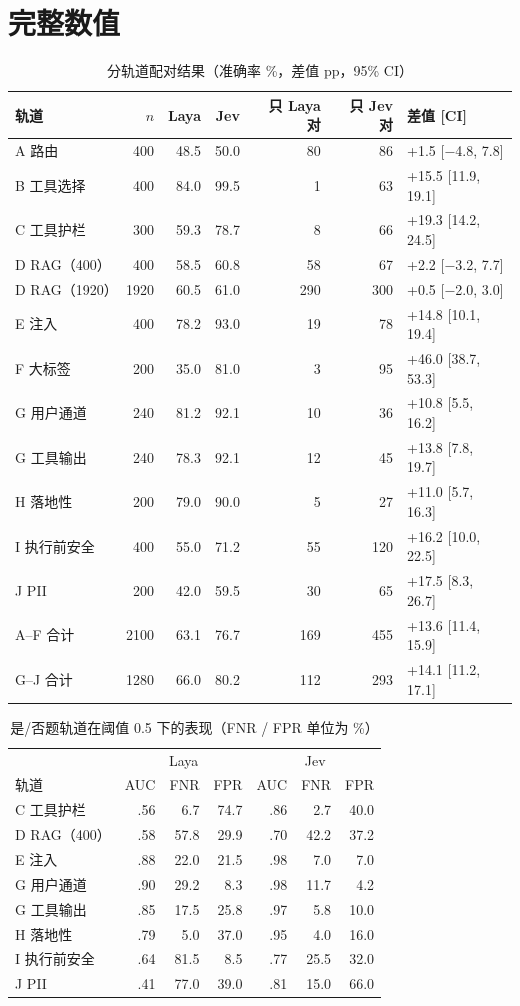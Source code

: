 \documentclass[UTF8,fontset=none,zihao=-4]{ctexart}
\newcommand{\laya}{\textsf{Laya}}
\newcommand{\jev}{\textsf{Jev}}
\begin{document}
\section{完整数值}
\begin{longtable}{@{}lrrrrrl@{}}
\caption{分轨道配对结果（准确率 \%，差值 pp，95\% CI）}\\
\toprule
轨道 & $n$ & \laya{} & \jev{} & 只 \laya{} 对 & 只 \jev{} 对 & 差值 [CI]\\
\midrule
\endhead
A 路由 & 400 & 48.5 & 50.0 & 80 & 86 & +1.5 [$-$4.8, 7.8]\\
B 工具选择 & 400 & 84.0 & 99.5 & 1 & 63 & +15.5 [11.9, 19.1]\\
C 工具护栏 & 300 & 59.3 & 78.7 & 8 & 66 & +19.3 [14.2, 24.5]\\
D RAG（400） & 400 & 58.5 & 60.8 & 58 & 67 & +2.2 [$-$3.2, 7.7]\\
D RAG（1920） & 1920 & 60.5 & 61.0 & 290 & 300 & +0.5 [$-$2.0, 3.0]\\
E 注入 & 400 & 78.2 & 93.0 & 19 & 78 & +14.8 [10.1, 19.4]\\
F 大标签 & 200 & 35.0 & 81.0 & 3 & 95 & +46.0 [38.7, 53.3]\\
G 用户通道 & 240 & 81.2 & 92.1 & 10 & 36 & +10.8 [5.5, 16.2]\\
G 工具输出 & 240 & 78.3 & 92.1 & 12 & 45 & +13.8 [7.8, 19.7]\\
H 落地性 & 200 & 79.0 & 90.0 & 5 & 27 & +11.0 [5.7, 16.3]\\
I 执行前安全 & 400 & 55.0 & 71.2 & 55 & 120 & +16.2 [10.0, 22.5]\\
J PII & 200 & 42.0 & 59.5 & 30 & 65 & +17.5 [8.3, 26.7]\\
\midrule
A--F 合计 & 2100 & 63.1 & 76.7 & 169 & 455 & +13.6 [11.4, 15.9]\\
G--J 合计 & 1280 & 66.0 & 80.2 & 112 & 293 & +14.1 [11.2, 17.1]\\
\bottomrule
\end{longtable}

\begin{longtable}{@{}lrrrrrr@{}}
\caption{是/否题轨道在阈值 0.5 下的表现（FNR / FPR 单位为 \%）}\\
\toprule
& \multicolumn{3}{c}{\laya} & \multicolumn{3}{c}{\jev}\\
轨道 & AUC & FNR & FPR & AUC & FNR & FPR\\
\midrule
\endhead
C 工具护栏 & .56 & 6.7 & 74.7 & .86 & 2.7 & 40.0\\
D RAG（400） & .58 & 57.8 & 29.9 & .70 & 42.2 & 37.2\\
E 注入 & .88 & 22.0 & 21.5 & .98 & 7.0 & 7.0\\
G 用户通道 & .90 & 29.2 & 8.3 & .98 & 11.7 & 4.2\\
G 工具输出 & .85 & 17.5 & 25.8 & .97 & 5.8 & 10.0\\
H 落地性 & .79 & 5.0 & 37.0 & .95 & 4.0 & 16.0\\
I 执行前安全 & .64 & 81.5 & 8.5 & .77 & 25.5 & 32.0\\
J PII & .41 & 77.0 & 39.0 & .81 & 15.0 & 66.0\\
\bottomrule
\end{longtable}
\end{document}
